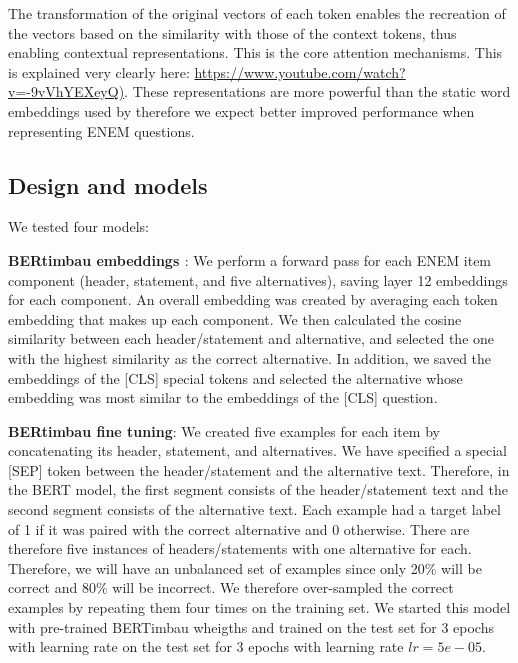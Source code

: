 \documentclass{article}
\begin{document}
The transformation of the original vectors of each token enables the recreation of the vectors based on the similarity with those of the context tokens, thus enabling contextual representations. This is the core attention mechanisms.  This is explained very clearly here: \url{https://www.youtube.com/watch?v=-9vVhYEXeyQ)}. These representations are more powerful than the static word embeddings  \cite{MikolovEfficientEstimationWord2013a} used by \cite{8575587} therefore we expect better improved performance when representing ENEM questions. 

\subsection{Design and models}
We tested four models: 

\textbf{BERtimbau embeddings  \cite{souza2020bertimbau}}: We perform a forward pass for each ENEM item component (header, statement, and five alternatives), saving layer 12 embeddings  for each component. An overall embedding was created by averaging each token embedding that makes up each component. We then calculated the cosine similarity between each header/statement and alternative, and selected the one with the highest similarity as the correct alternative. In addition, we saved the embeddings of the [CLS] special tokens and selected the alternative whose embedding was most similar to the embeddings of the [CLS] question.

\textbf{BERtimbau fine tuning}: We created five examples for each item by concatenating its header, statement, and alternatives. We have specified a special [SEP] token between the header/statement and the alternative text. Therefore, in the BERT model, the first segment consists of the header/statement text and the second segment consists of the alternative text. Each example had a target label of 1 if it was paired with the correct alternative and 0 otherwise.  There are therefore five instances of headers/statements with one alternative for each. Therefore, we will have an unbalanced set of examples since only 20\% will be correct and 80\% will be incorrect. We therefore over-sampled the correct examples by repeating them four times on the training set. We started this model with pre-trained BERTimbau wheigths and trained on the test set for 3 epochs with learning rate on the test set for 3 epochs with learning rate $lr = 5e-05$.
\end{document}
